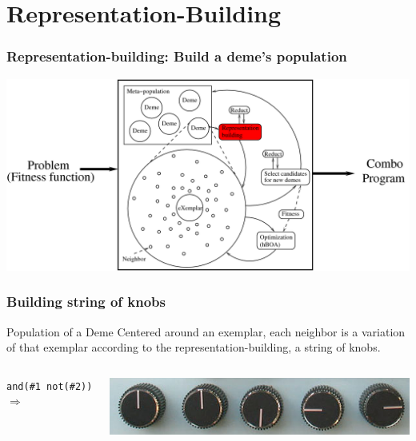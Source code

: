 \documentclass{beamer}
\begin{document}
\section{Representation-Building}

\frame
{
  \frametitle{Representation-building: Build a deme's population}

  \begin{center}

  \includegraphics[scale=0.2]{MOSESSumDetailsRB.png}

  \end{center}  

}

\frame
{
  \frametitle{Building string of knobs}

  \begin{beamerboxesrounded}{Population of a Deme}
    \alert{Centered around an exemplar},
    each neighbor
    is a \alert{variation} of that exemplar according to the
    representation-building, a \alert{string of knobs}.
  \end{beamerboxesrounded}


  \begin{columns}
    
    \column{1.5in}
    {\tt and(\#1 not(\#2))}
    \column{0.2in}
    $\Rightarrow$
    \column{2in}
    
    \includegraphics[scale=0.27]{knobs.png}
    
  \end{columns}
}
\end{document}
